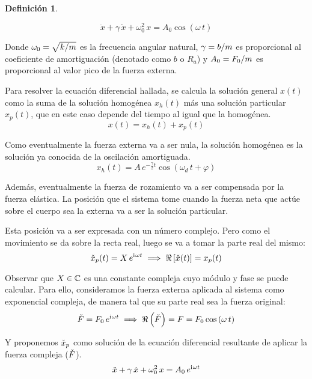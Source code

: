 \documentclass[a5paper,12pt,twoside]{book}
\newtheorem{defn}{{Definición}}[chapter]
\begin{document}
\begin{mdframed}[style=MyFrame1]
    \begin{defn}
    \end{defn}
    \begin{equation*}
        \ddot{x} + \gamma \, \dot{x} + \omega_0^2 \, x  = A_0 \cos \left( \omega \, t \right)
    \end{equation*}
\end{mdframed}

Donde $\omega_0 = \sqrt{k/m}$ es la frecuencia angular natural, $\gamma = b/m$ es proporcional al coeficiente de amortiguación (denotado como $b$ o $R_a$) y $A_0=F_0/m$ es proporcional al valor pico de la fuerza externa.

Para resolver la ecuación diferencial hallada, se calcula la solución general $x(t)$ como la suma de la solución homogénea $x_h(t)$ más una solución particular $x_p(t)$, que en este caso depende del tiempo al igual que la homogénea.
\[
    x(t) = x_h(t) + x_p(t)
\]

Como eventualmente la fuerza externa va a ser nula, la solución homogénea es la solución ya conocida de la oscilación amortiguada.
\[
    x_h(t) = A \, e^{-\tfrac{\gamma}{2}t} \cos(\omega_d \, t + \varphi)
\]

Además, eventualmente la fuerza de rozamiento va a ser compensada por la fuerza elástica.
La posición que el sistema tome cuando la fuerza neta que actúe sobre el cuerpo sea la externa va a ser la solución particular.

Esta posición va a ser expresada con un número complejo.
Pero como el movimiento se da sobre la recta real, luego se va a tomar la parte real del mismo:
\[
    \check{x}_p(t) = X \, e^{\mathrm{i}\mkern1mu \omega t} \implies \Re \left[ \check{x} (t) \right] = x_p(t)
\]

Observar que $X \in \mathbb{C}$ es una constante compleja cuyo módulo y fase se puede calcular.
Para ello, consideramos la fuerza externa aplicada al sistema como exponencial compleja, de manera tal que su parte real sea la fuerza original:
\[
    \check{F} = F_0 \, e^{\mathrm{i}\mkern1mu \omega t} \implies \Re \left( \check{F} \right) = F = F_0 \cos \left( \omega \, t \right)
\]

Y proponemos $\check{x}_p$ como solución de la ecuación diferencial resultante de aplicar la fuerza compleja ($\check{F}$).
\[
    \ddot{x} + \gamma \, \dot{x} + \omega_0^2 \, x  = A_0 \, e^{\mathrm{i}\mkern1mu \omega t}
\]
\end{document}
